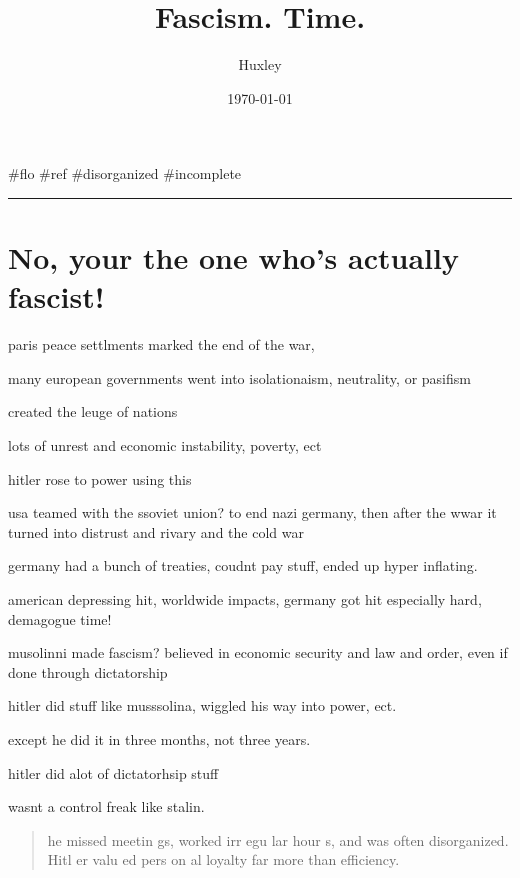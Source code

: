 \documentclass[letterpaper]{article}
\author{Huxley}
\date{\today}
\title{Fascism. Time.}
\renewcommand{\tableofcontents}{}
\begin{document}
\tableofcontents

\#flo \#ref \#disorganized \#incomplete

\noindent\rule{\textwidth}{0.5pt}

\section{No, your the one who's actually fascist!}
\label{sec:org0dfb577}
paris peace settlments marked the end of the war,

many european governments went into isolationaism, neutrality, or
pasifism

created the leuge of nations

lots of unrest and economic instability, poverty, ect

hitler rose to power using this

usa teamed with the ssoviet union? to end nazi germany, then after the
wwar it turned into distrust and rivary and the cold war

germany had a bunch of treaties, coudnt pay stuff, ended up hyper
inflating.

american depressing hit, worldwide impacts, germany got hit especially
hard, demagogue time!

musolinni made fascism? believed in economic security and law and order,
even if done through dictatorship

hitler did stuff like musssolina, wiggled his way into power, ect.

except he did it in three months, not three years.

hitler did alot of dictatorhsip stuff

wasnt a control freak like stalin.

\begin{quote}
he missed meetin gs, worked irr egu lar hour s, and was often
disorganized. Hitl er valu ed pers on al loyalty far more than
efficiency.
\end{quote}
\end{document}
